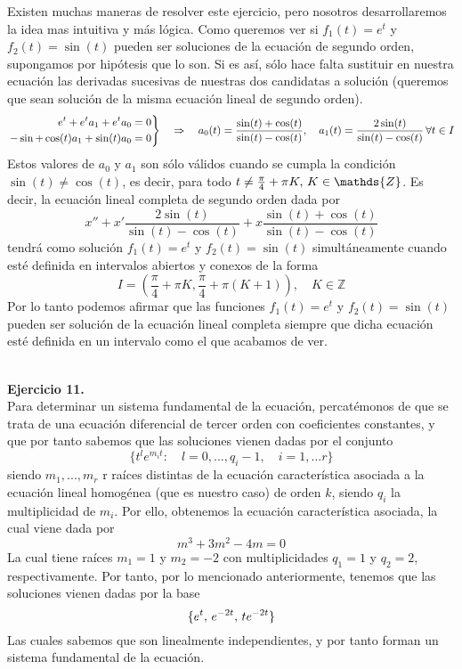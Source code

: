 \documentclass[fleqn]{article}
\def\Z{\mathds{Z}}
\begin{document}
    Existen muchas maneras de resolver este ejercicio, pero nosotros desarrollaremos la idea mas intuitiva y más lógica. Como queremos ver si $f_1(t) = e^t$ y $f_2(t)=\sin (t)$
    pueden ser soluciones de la ecuación de segundo orden, supongamos por hipótesis que lo son. Si es así, sólo hace falta sustituir en nuestra ecuación 
    las derivadas sucesivas de nuestras dos candidatas a solución (queremos que sean solución de la misma ecuación lineal de segundo orden).
    \begin{equation*}
        \left.
        \begin{aligned}
            e^t + e^ta_1 + e^t a_0 = 0 \\
            -\sin + \cos(t)a_1 + \sin(t)a_0=0
        \end{aligned}
        \right\} \quad \Rightarrow \quad a_0(t)=\frac{\sin(t) + \cos(t)}{\sin(t) - \cos(t)}, \quad a_1(t)=\frac{2\sin(t)}{\sin(t) - \cos(t)} \thinspace \forall t \in I
    \end{equation*}
    Estos valores de $a_0$ y $a_1$ son sólo válidos cuando se cumpla la condición $\sin(t) \neq \cos(t)$, es decir, para todo $t \neq \frac{\pi}{4} + \pi K, \thinspace K \in \Z$.
    Es decir, la ecuación lineal completa de segundo orden dada por 
    $$x'' + x'\frac{2\sin(t)}{\sin(t) - \cos(t)} + x\frac{\sin(t) + \cos(t)}{\sin(t) - \cos(t)}$$
    tendrá como solución $f_1(t) = e^t$ y $f_2(t)=\sin (t)$ simultáneamente cuando esté definida en intervalos abiertos y conexos de la forma 
    $$I = \left(\frac{\pi}{4} + \pi K, \frac{\pi}{4} + \pi (K+1)\right), \quad K \in \Z$$
    Por lo tanto podemos afirmar que las funciones $f_1(t) = e^t$ y $f_2(t)=\sin (t)$ pueden ser solución de la ecuación lineal completa siempre que dicha ecuación
    esté definida en un intervalo como el que acabamos de ver.\\ \\

    \newpage
    
    \textbf{Ejercicio 11.} \\

    Para determinar un sistema fundamental de la ecuación, percatémonos de que se trata de una ecuación diferencial de tercer orden con coeficientes constantes,
    y que por tanto sabemos que las soluciones vienen dadas por el conjunto
    $$\{t^le^{m_it}: \quad l=0,...,q_i-1, \quad i=1,...r\}$$
    siendo $m_1,...,m_r$ r raíces distintas de la ecuación característica asociada a la ecuación lineal homogénea (que es nuestro caso) de orden $k$, siendo 
    $q_i$ la multiplicidad de $m_i$. Por ello, obtenemos la ecuación característica asociada, la cual viene dada por 
    $$m^3 + 3m^2 -4m = 0$$
    La cual tiene raíces $m_1 = 1$ y $m_2 = -2$ con multiplicidades $q_1 = 1$ y $q_2 = 2$, respectivamente. Por tanto, por lo mencionado anteriormente, tenemos
    que las soluciones vienen dadas por la base 
    $$\{e^t, \thinspace e^{-2t}, \thinspace te^{-2t}\}$$
    Las cuales sabemos que son linealmente independientes, y por tanto forman un sistema fundamental de la ecuación.
\end{document}
